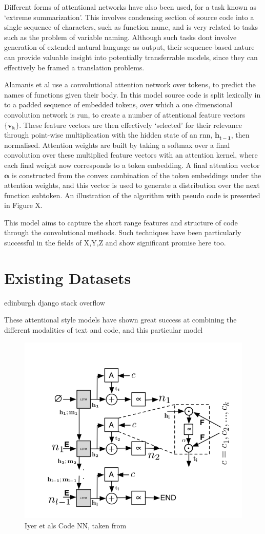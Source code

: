 Different forms of attentional networks have also been used, for a task known as `extreme summarization'. 
This involves condensing section of source code into a single sequence of characters, such as function name, and is very related to tasks such as the problem of variable naming. 
Although such tasks dont involve generation of extended natural language as output, their sequence-based nature can provide valuable insight into potentially transferrable models, since they can effectively be framed a translation problems.

Alamanis et al \cite{allamanis_convolutional_2016} use a convolutional attention network over tokens, to predict the names of functions given their body. 
In this model source code is split lexically in to a padded sequence of embedded tokens, over which a one dimensional convolution network is run, to create a number of attentional feature vectors $\mathbf{\{v_k\}}$.
These feature vectors are then effectively `selected' for their relevance through point-wise multiplication with the hidden state of an rnn, $\mathbf{h_{t-1}}$,  then normalised.
Attention weights are built by taking a softmax over a final convolution over these multiplied feature vectors with an attention kernel, where each final weight now corresponds to a token embedding. 
A final attention vector $\mathbf{\alpha}$ is constructed from the convex combination of the token embeddings under the attention weights, and this vector is used to generate a distribution over the next function subtoken.
An illustration of the algorithm with pseudo code is presented in Figure X.

This model aims to capture the short range features and structure of code through the convolutional methods. Such techniques have been particularly successful in the fields of X,Y,Z and show significant promise here too. 




\section{Existing Datasets}

edinburgh
django
stack overflow


These attentional style models have shown great success at combining the different modalities of text and code, and this particular model
\begin{figure}[tb]
    \centering
    \includegraphics[width=0.5\linewidth]{ModelPics/Iyer_etal.png}
    \caption{Iyer et als Code NN, taken from \cite{iyer_summarizing_2016}}
    \label{fig:Iyer}
\end{figure}

